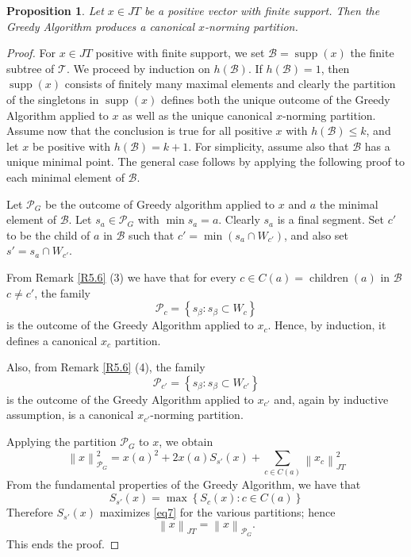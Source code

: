 \documentclass[11pt,a4paper]{amsart}
\newtheorem{proposition}[theorem]{Proposition}
\newcommand{\JT}{JT}
\newcommand{\Tree}{\mathcal{T}}
\newcommand{\norm}[1]{\left\lVert#1\right\rVert}
\newcommand{\supp}{\operatorname{supp}}
\begin{document}
\begin{proposition}\label{prop.5.6}
    Let $x \in \JT$ be a positive vector with finite support. Then the Greedy Algorithm produces a canonical $x$-norming partition.
\end{proposition}

\begin{proof} For $x\in \JT $ positive with finite support, we set $\mathcal{B} = \supp(x) $ the finite subtree of $\Tree$.
We proceed by induction on $h(\mathcal{B})$. If $h(\mathcal{B}) =1 $, then $\supp(x)$ consists of finitely many maximal
elements and clearly the partition of the singletons in $\supp(x)$ defines both the unique outcome of the Greedy Algorithm 
applied to $x$ as well as the unique canonical $x$-norming partition. Assume now that the conclusion is true for all positive $x$ with $h(\mathcal{B})\le k$, and let $x$ be positive with $h(\mathcal{B})=k+1$. For simplicity, assume also that $\mathcal{B}$ has a unique minimal point. The general case follows by applying the following proof to each minimal element of $\mathcal{B}$.

Let $\mathcal{P}_G$ be the outcome of Greedy algorithm applied to $x$ and $a$ the minimal element of $\mathcal{B}$.
Let $s_a \in \mathcal{P}_G $ with $\min s_a = a$. Clearly $s_a$ is a final segment. Set $c'$ to be the child of $a$ in $\mathcal{B}$ such that $c' = \min( s_a \cap W_{c'})$, and also set $s' = s_a\cap W_{c'}$.

From Remark \ref{R5.6} (3) we have that for every   $ c \in C(a) = \operatorname{children}(a)$ in $\mathcal{B}$ 
 $c\ne c'$, the family 
$$\mathcal{P}_c = \left \{ s_\beta : s_\beta \subset W_c \right \} $$
is the outcome of the Greedy Algorithm applied to $x_c$. Hence, by induction, it defines a canonical $x_c$ partition.

Also, from Remark \ref{R5.6} (4), the family 
  $$ \mathcal{P}_{c'} = \left \{ s_\beta : s_\beta \subset W_{c'} \right \} $$
 is the outcome of the Greedy Algorithm applied to $x_{c'}$ and, again by inductive assumption, is a canonical $x_{c'}$-norming partition.
 
 Applying the partition $\mathcal{P}_G$ to $x$, we obtain
        \begin{equation} \label{eq7}
         \norm{x}_{\mathcal{P}_G }^2 = x(a)^2 + 2x(a)S_{s'}(x) + \sum_{c \in C(a)} \norm{x_c}_{\JT}^2
    \end{equation}
From the fundamental properties of the Greedy Algorithm, we have that
  $$  S_{s'} (x) = \max \left\{ S_c(x) : c\in C(a) \right \} $$
 Therefore $S_{s'}(x)$ maximizes \eqref{eq7} for the various partitions; hence
$$ \norm{x}_{\JT} = \norm{x}_{\mathcal{P}_G}. $$
This ends the proof.
\end{proof}
\end{document}
